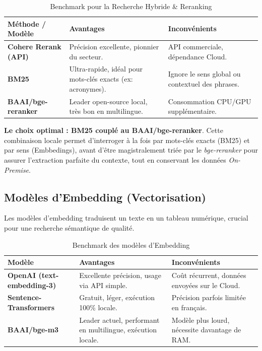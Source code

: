 \documentclass[12pt,a4paper]{article}
\begin{document}
\begin{table}[H]
    \centering
    \renewcommand{\arraystretch}{1.5}
    \begin{tabularx}{\textwidth}{|X|X|X|}
        \hline
        \textbf{Méthode / Modèle} & \textbf{Avantages} & \textbf{Inconvénients} \\
        \hline
        \textbf{Cohere Rerank (API)} & Précision excellente, pionnier du secteur. & API commerciale, dépendance Cloud. \\
        \hline
        \textbf{BM25} & Ultra-rapide, idéal pour mots-clés exacts (ex: acronymes). & Ignore le sens global ou contextuel des phrases. \\
        \hline
        \textbf{BAAI/bge-reranker} & Leader open-source local, très bon en multilingue. & Consommation CPU/GPU supplémentaire. \\
        \hline
    \end{tabularx}
    \caption{Benchmark pour la Recherche Hybride \& Reranking}
\end{table}

\textbf{Le choix optimal : BM25 couplé au BAAI/bge-reranker}. Cette combinaison locale permet d'interroger à la fois par mots-clés exacts (BM25) et par sens (Embbedings), avant d'être magistralement triée par le \textit{bge-reranker} pour assurer l'extraction parfaite du contexte, tout en conservant les données \textit{On-Premise}.

\subsection{Modèles d'Embedding (Vectorisation)}
Les modèles d'embedding traduisent un texte en un tableau numérique, crucial pour une recherche sémantique de qualité.

\begin{table}[H]
    \centering
    \renewcommand{\arraystretch}{1.5}
    \begin{tabularx}{\textwidth}{|X|X|X|}
        \hline
        \textbf{Modèle} & \textbf{Avantages} & \textbf{Inconvénients} \\
        \hline
        \textbf{OpenAI (text-embedding-3)} & Excellente précision, usage via API simple. & Coût récurrent, données envoyées sur le Cloud. \\
        \hline
        \textbf{Sentence-Transformers} & Gratuit, léger, exécution 100\% locale. & Précision parfois limitée en français. \\
        \hline
        \textbf{BAAI/bge-m3} & Leader actuel, performant en multilingue, exécution locale. & Modèle plus lourd, nécessite davantage de RAM. \\
        \hline
    \end{tabularx}
    \caption{Benchmark des modèles d'Embedding}
\end{table}
\end{document}
